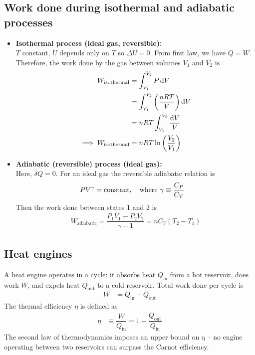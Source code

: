 	\subsection{Work done during isothermal and adiabatic processes}
		\begin{itemize}
			\item \textbf{Isothermal process (ideal gas, reversible):}\\
			$T$ constant, $U$ depends only on $T$ so $\Delta U=0$. From first law, we have $Q=W$. Therefore, the work done by the gas between volumes $V_1$ and $V_2$ is
			\begin{align*}
				W_\text{isothermal}&=\int_{V_1}^{V_2}{P\dd{V}} \\
				&=\int_{V_1}^{V_2}{\qty(\dfrac{nRT}{V})\dd{V}} \\
				&=nRT\int_{V_1}^{V_2}{\dfrac{\dd{V}}{V}} \\
				\implies W_\text{isothermal}&=nRT\ln{\qty(\dfrac{V_2}{V_1})}
			\end{align*}
			
			\item \textbf{Adiabatic (reversible) process (ideal gas):}\\
			Here, $\delta{Q}=0$. For an ideal gas the reversible adiabatic relation is
			\begin{align*}
				PV^\gamma=\text{constant},\qq{where $\gamma\equiv\dfrac{C_P}{C_V}$}
			\end{align*}
			Then the work done between states 1 and 2 is
			\begin{align*}
				W_\text{adiabatic}=\dfrac{P_1V_1-P_2V_2}{\gamma-1}=nC_V(T_2-T_1)
			\end{align*}
		\end{itemize}
		
	\subsection{Heat engines}
		A heat engine operates in a cycle: it absorbs heat $Q_\text{in}$ from a hot reservoir, does work $W$, and expels heat $Q_\text{out}$ to a cold reservoir. Total work done per cycle is
		\begin{align*}
			W&=Q_\text{in}-Q_\text{out}
		\end{align*}
		The thermal efficiency $\eta$ is defined as
		\begin{align*}
			\eta&\equiv\dfrac{W}{Q_\text{in}}=1-\dfrac{Q_\text{out}}{Q_\text{in}}
		\end{align*}
		The second law of thermodynamics imposes an upper bound on $\eta$ -- no engine operating between two reservoirs can surpass the Carnot efficiency.